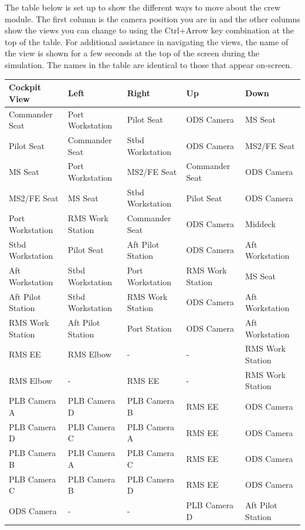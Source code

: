 \documentclass[13pt]{article}
\begin{document}
\begin{multicols}{2}
The table below is set up to show the different ways to move about the crew module. The first column is the camera position you are in and the other columns show the views you can change to using the Ctrl+Arrow key combination at the top of the table. For additional assistance in navigating the views, the name of the view is shown for a few seconds at the top of the screen during the simulation. The names in the table are identical to those that appear on-screen.\\
\end{multicols}
\begin{tabular}{|l|l|l|l|l|}
	\hline
	Cockpit View & Left & Right & Up & Down \\
	\hline \hline
	Commander Seat & Port Workstation & Pilot Seat & ODS Camera & MS Seat \\
	\hline
	Pilot Seat & Commander Seat & Stbd Workstation & ODS Camera & MS2/FE Seat \\
	\hline
	MS Seat & Port Workstation & MS2/FE Seat & Commander Seat & ODS Camera\\
	\hline
	MS2/FE Seat & MS Seat & Stbd Workstation & Pilot Seat & ODS Camera\\
	\hline
	Port Workstation & RMS Work Station & Commander Seat & ODS Camera & Middeck\\
	\hline
	Stbd Workstation & Pilot Seat & Aft Pilot Station & ODS Camera & Aft Workstation\\
	\hline
	Aft Workstation & Stbd Workstation & Port Workstation & RMS Work Station & MS Seat\\
	\hline
	Aft Pilot Station & Stbd Workstation & RMS Work Station & ODS Camera & Aft Workstation\\
	\hline
	RMS Work Station & Aft Pilot Station & Port Station & ODS Camera & Aft Workstation\\
	\hline
	RMS EE & RMS Elbow & - & - & RMS Work Station\\
	\hline
	RMS Elbow & - & RMS EE & - & RMS Work Station\\
	\hline
	PLB Camera A & PLB Camera D & PLB Camera B & RMS EE & ODS Camera\\
	\hline
	PLB Camera D & PLB Camera C & PLB Camera A & RMS EE & ODS Camera\\
	\hline
	PLB Camera B & PLB Camera A & PLB Camera C & RMS EE & ODS Camera\\
	\hline
	PLB Camera C & PLB Camera B & PLB Camera D & RMS EE & ODS Camera\\
	\hline
	ODS Camera & - & - & PLB Camera D & Aft Pilot Station\\
	\hline
\end{tabular}
\newpage
\end{document}
